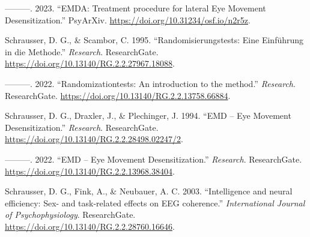 \documentclass[
]{article}
\newlength{\cslhangindent}
\newlength{\cslentryspacingunit} %
\newenvironment{CSLReferences}[2] %
 {%
  \setlength{\parindent}{0pt}
  \ifodd #1
  \let\oldpar\par
  \def\par{\hangindent=\cslhangindent\oldpar}
  \fi
  \setlength{\parskip}{#2\cslentryspacingunit}
 }%
 {}
\begin{document}
\begin{CSLReferences}{1}{0}
\leavevmode{}%
---------. 2023. {``{EMDA: Treatment procedure for lateral Eye Movement
Desensitization}.''} PsyArXiv.
\url{https://doi.org/10.31234/osf.io/n2r5z}.

\leavevmode{}%
Schrausser, D. G., \& Scambor, C. 1995. {``{Randomisierungstests: Eine
Einführung in die Methode}.''} \emph{Research}. ResearchGate.
\url{https://doi.org/10.13140/RG.2.2.27967.18088}.

\leavevmode{}%
---------. 2022. {``{Randomizationtests: An introduction to the
method}.''} \emph{Research}. ResearchGate.
\url{https://doi.org/10.13140/RG.2.2.13758.66884}.

\leavevmode{}%
Schrausser, D. G., Draxler, J., \& Plechinger, J. 1994. {``{EMD -- Eye
Movement Desensitization}.''} \emph{Research}. ResearchGate.
\url{https://doi.org/10.13140/RG.2.2.28498.02247/2}.

\leavevmode{}%
---------. 2022. {``{EMD -- Eye Movement Desensitization}.''}
\emph{Research}. ResearchGate.
\url{https://doi.org/10.13140/RG.2.2.13968.38404}.

\leavevmode{}%
Schrausser, D. G., Fink, A., \& Neubauer, A. C. 2003. {``{Intelligence
and neural efficiency: Sex- and task-related effects on EEG
coherence}.''} \emph{International Journal of Psychophysiology}.
ResearchGate. \url{https://doi.org/10.13140/RG.2.2.28760.16646}.

\end{CSLReferences}
\end{document}
